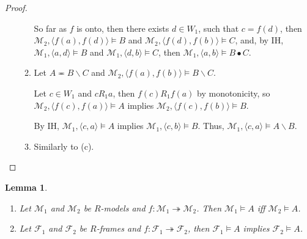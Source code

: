 \documentclass[a4paper]{article}
\theoremstyle{defin}
\theoremstyle{theorem}
\theoremstyle{prop}
\theoremstyle{lemma}
\newtheorem{lemma}{Lemma}
\theoremstyle{ex}
\theoremstyle{col}
\begin{document}
\begin{proof}
\begin{enumerate}
\begin{enumerate}
      So far as $f$ is onto, then there exists $d \in W_1$, such that $c = f(d)$, then $\mathcal{M}_2, \langle f(a), f(d) \rangle \models B$ and
      $\mathcal{M}_2, \langle f(d), f(b) \rangle \models C$, and, by IH, $\mathcal{M}_1, \langle a, d \rangle \models B$ and
      $\mathcal{M}_1, \langle d, b \rangle \models C$, then $\mathcal{M}_1, \langle a, b \rangle \models B \bullet C$.

      \item Let $A \eqcirc B \backslash C$ and $\mathcal{M}_2, \langle f(a), f(b) \rangle \models B \backslash C$.

      Let $c \in W_1$ and $c R_1 a$, then $f(c) R_1 f(a)$ by monotonicity, so $\mathcal{M}_2, \langle f(c), f(a) \rangle \models A$ implies
      $\mathcal{M}_2, \langle f(c), f(b) \rangle \models B$.

      By IH, $\mathcal{M}_1, \langle c, a \rangle \models A$ implies $\mathcal{M}_1, \langle c, b \rangle \models B$. Thus,
      $\mathcal{M}_1, \langle c, a \rangle \models A \backslash B$.
      \item Similarly to (c).
    \end{enumerate}
  \end{enumerate}
\end{proof}

\begin{lemma}
$ $

  \begin{enumerate}
    \item Let $\mathcal{M}_1$ and $\mathcal{M}_2$ be $R$-models and $f : \mathcal{M}_1 \twoheadrightarrow \mathcal{M}_2$. Then $\mathcal{M}_1 \models A$ iff
    $\mathcal{M}_2 \models A$.

    \item Let $\mathcal{F}_1$ and $\mathcal{F}_2$ be $R$-frames and $f : \mathcal{F}_1 \twoheadrightarrow \mathcal{F}_2$,
    then $\mathcal{F}_1 \models A$ implies $\mathcal{F}_2 \models A$.
  \end{enumerate}
\end{lemma}
\end{document}
